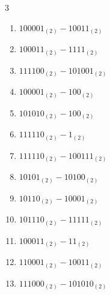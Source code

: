 \begin{multicols}{3}
\begin{enumerate}
\columnbreak %

  \item $100001_{(2)} - 10011_{(2)}$


  \item $100011_{(2)} - 1111_{(2)}$


  \item $111100_{(2)} - 101001_{(2)}$


  \item $100001_{(2)} - 100_{(2)}$


  \item $101010_{(2)} - 100_{(2)}$


  \item $111110_{(2)} - 1_{(2)}$


  \item $111110_{(2)} - 100111_{(2)}$


  \item $10101_{(2)} - 10100_{(2)}$


  \item $10110_{(2)} - 10001_{(2)}$


  \item $101110_{(2)} - 11111_{(2)}$


\columnbreak %

\resetques

  \item $100011_{(2)} - 11_{(2)}$


  \item $110001_{(2)} - 10011_{(2)}$


  \item $111000_{(2)} - 101010_{(2)}$



\end{enumerate}
\end{multicols}
